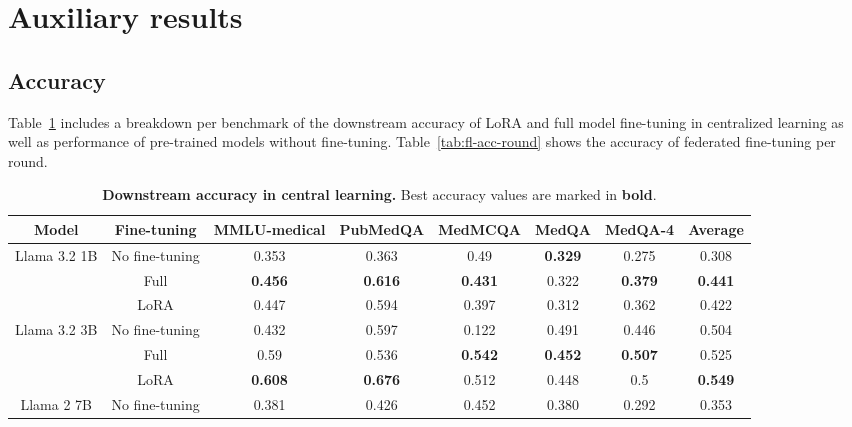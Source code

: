 \section{Auxiliary results}
\label{sec:aux}

\subsection{Accuracy}
\label{sec:aux-acc}
Table~\ref{tab:cl-acc-round} includes a breakdown per benchmark of the downstream accuracy of LoRA and full model fine-tuning in centralized learning as well as performance of pre-trained models without fine-tuning. Table~\ref{tab:fl-acc-round} shows the accuracy of federated fine-tuning per round.

\begin{table}[ht]
\caption{\textbf{Downstream accuracy in central learning.} Best accuracy values are marked in \textbf{bold}.}
\label{tab:cl-acc-round}
\vskip 0.15in
\begin{center}
\begin{tabular}{@{}cccccccc@{}}
\toprule
Model                                              & Fine-tuning               & MMLU-medical   & PubMedQA                   & MedMCQA & MedQA & MedQA-4 & Average \\ \midrule
\multicolumn{1}{c}{\multirow{3}{*}{Llama 3.2 1B}} & \multicolumn{1}{c|}{No fine-tuning} & 0.353 & 0.363 & 0.49                      & \textbf{0.329}                     & 0.275                     & 0.308   \\
                                                 & \multicolumn{1}{c|}{Full} & \textbf{0.456} & \textbf{0.616} & \textbf{0.431}   & 0.322 & \textbf{0.379}   & \textbf{0.441}   \\
                                                  & \multicolumn{1}{c|}{LoRA} & 0.447          & 0.594 & 0.397   & 0.312 & 0.362   & 0.422   \\\midrule
\multirow{3}{*}{Llama 3.2 3B}                      & \multicolumn{1}{c|}{No fine-tuning} & 0.432 & 0.597 & 0.122 & 0.491 & 0.446 & 0.504   \\
                      & \multicolumn{1}{c|}{Full} & 0.59           & 0.536 & \textbf{0.542}   & \textbf{0.452} & \textbf{0.507}   & 0.525   \\
                                                   & \multicolumn{1}{c|}{LoRA} & \textbf{0.608}          & \textbf{0.676} & 0.512   & 0.448 & 0.5     & \textbf{0.549}   \\\midrule
\multirow{3}{*}{Llama 2 7B}                        & \multicolumn{1}{c|}{No fine-tuning} & 0.381 & 0.426 & 0.452                     & 0.380                     & 0.292                     & 0.353   \\

\end{tabular}
\end{center}
\end{table}
